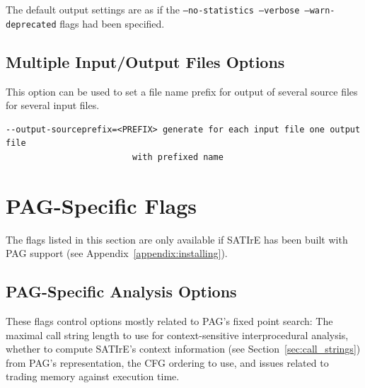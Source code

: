 \documentclass[a4paper,12pt]{report}
\begin{document}
The default output settings are as if the \texttt{--no-statistics
--verbose --warn-deprecated} flags had been specified.

\subsection{Multiple Input/Output Files Options}

This option can be used to set a file name prefix for output of several source
files for several input files.

{\footnotesize
\begin{verbatim}
--output-sourceprefix=<PREFIX> generate for each input file one output file
                         with prefixed name
\end{verbatim}
}

\section{PAG-Specific Flags}
\label{sec:pag_flags}

The flags listed in this section are only available if SATIrE has been built
with PAG support (see Appendix~\ref{appendix:installing}).

\subsection{PAG-Specific Analysis Options}

These flags control options mostly related to PAG's fixed point search: The
maximal call string length to use for context-sensitive interprocedural
analysis, whether to compute SATIrE's context information (see
Section~\ref{sec:call_strings}) from PAG's representation, the CFG ordering
to use, and issues related to trading memory against execution time.
\end{document}
